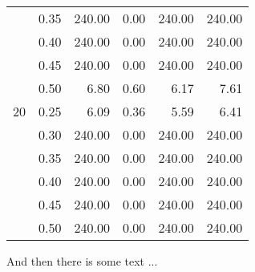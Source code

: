 \documentclass[11pt]{article}
\begin{document}
\begin{table}
\begin{tabular}{llrrrr}
    & 0.35 & 240.00 & 0.00 & 240.00 & 240.00 \\
    & 0.40 & 240.00 & 0.00 & 240.00 & 240.00 \\
    & 0.45 & 240.00 & 0.00 & 240.00 & 240.00 \\
    & 0.50 &   6.80 & 0.60 &   6.17 &   7.61 \\
    \hline
    20 & 0.25 &   6.09 & 0.36 &   5.59 &   6.41 \\
    & 0.30 & 240.00 & 0.00 & 240.00 & 240.00 \\
    & 0.35 & 240.00 & 0.00 & 240.00 & 240.00 \\
    & 0.40 & 240.00 & 0.00 & 240.00 & 240.00 \\
    & 0.45 & 240.00 & 0.00 & 240.00 & 240.00 \\
    & 0.50 & 240.00 & 0.00 & 240.00 & 240.00 \\
    \bottomrule
  \end{tabular}
\end{table}
And then there is some text ...
\end{document}
